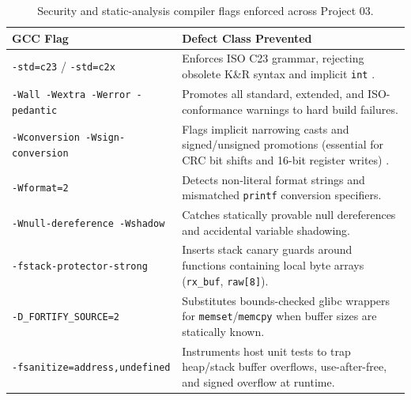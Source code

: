\documentclass[11pt,a4paper,oneside]{report}
\begin{document}
\begin{table}[!htbp]
\centering
\caption{Security and static-analysis compiler flags enforced across Project 03.}
\label{tab:app_flags}
\begin{tabularx}{\linewidth}{l X}
\toprule
\textbf{GCC Flag} & \textbf{Defect Class Prevented} \\
\midrule
\texttt{-std=c23} / \texttt{-std=c2x} & Enforces ISO C23 grammar, rejecting obsolete K\&R syntax and implicit \texttt{int} \cite{gcc_dialect}. \\
\texttt{-Wall -Wextra -Werror -pedantic} & Promotes all standard, extended, and ISO-conformance warnings to hard build failures. \\
\texttt{-Wconversion -Wsign-conversion} & Flags implicit narrowing casts and signed/unsigned promotions (essential for CRC bit shifts and 16-bit register writes) \cite{seacord2020,misra2025}. \\
\texttt{-Wformat=2} & Detects non-literal format strings and mismatched \texttt{printf} conversion specifiers. \\
\texttt{-Wnull-dereference -Wshadow} & Catches statically provable null dereferences and accidental variable shadowing. \\
\texttt{-fstack-protector-strong} & Inserts stack canary guards around functions containing local byte arrays (\texttt{rx\_buf}, \texttt{raw[8]}). \\
\texttt{-D\_FORTIFY\_SOURCE=2} & Substitutes bounds-checked glibc wrappers for \texttt{memset}/\texttt{memcpy} when buffer sizes are statically known. \\
\texttt{-fsanitize=address,undefined} & Instruments host unit tests to trap heap/stack buffer overflows, use-after-free, and signed overflow at runtime. \\
\bottomrule
\end{tabularx}
\end{table}
\end{document}
